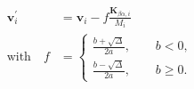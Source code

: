 \documentclass{article}
\renewcommand{\vec}[1]{\ensuremath{\mathbf{#1}}}
\begin{document}
\begin{align}
  \vec{v}_i^\prime&=\vec{v}_i-f\frac{\vec{K}_{\beta\alpha, i}}{M_i}\nonumber\\
  \mathrm{with}\quad f&=
  \begin{cases}
    \frac{b+\sqrt{\Delta}}{2a},\qquad b<0,\nonumber\\
    \frac{b-\sqrt{\Delta}}{2a},\qquad b\geq 0.
  \end{cases}
\nonumber\end{align}
\end{document}
